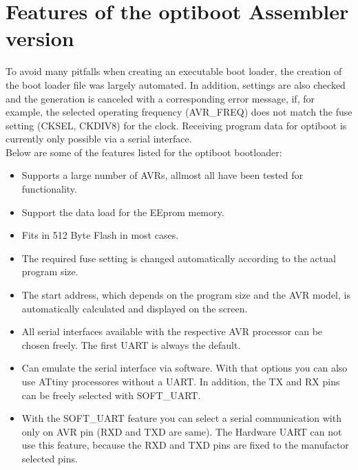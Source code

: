 \section{Features of the optiboot Assembler version}

To avoid many pitfalls when creating an executable boot loader,
the creation of the boot loader file was largely automated.
In addition, settings are also checked and the generation is
canceled with a corresponding error message,
if, for example, the selected operating frequency (AVR\_FREQ) does not match the
fuse setting (CKSEL, CKDIV8) for the clock.
Receiving program data for optiboot is currently only possible via a serial interface. \\

Below are some of the features listed for the optiboot bootloader:
\begin{itemize}

\item {Supports a large number of AVRs, allmost all have been tested for functionality.}

\item {Support the data load for the EEprom memory.}

\item {Fits in 512 Byte Flash in most cases.}

\item {The required fuse setting is changed automatically according to the actual program size.}

\item {The start address, which depends on the program size and the AVR model,
	is automatically calculated and displayed on the screen.}

\item {All serial interfaces available with the respective AVR processor
         can be chosen freely. The first UART is always the default.}

\item {Can emulate the serial interface via software.
	With that options you can also use ATtiny processores without a UART.
        In addition, the TX and RX pins can be freely selected with SOFT\_UART.}

\item {With the SOFT\_UART feature you can select a serial communication with only on AVR pin (RXD and TXD are same).
	The Hardware UART can not use this feature, because the RXD and TXD pins are fixed to the
		manufactor selected pins.}


\end{itemize}
